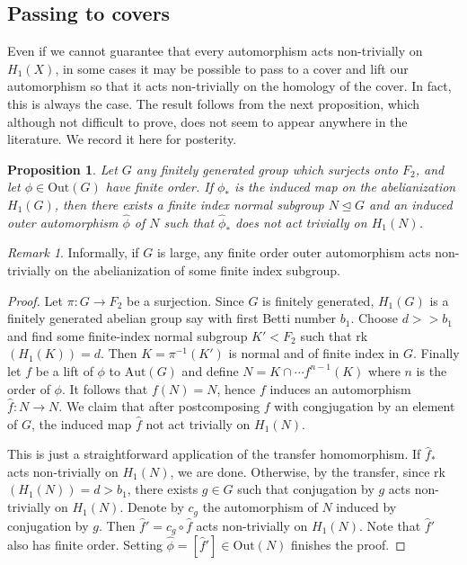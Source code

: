 \documentclass[11pt]{amsart}
\numberwithin{thm}{section}
\newtheorem{proposition}[thm]{Proposition}
\theoremstyle{remark}
\newtheorem{rmk}[thm]{Remark}
\theoremstyle{definition}
\newcommand{\Aut}{\text{Aut}}
\newcommand{\Out}{\text{Out}}
\newcommand{\what}{\widehat}
\begin{document}
\subsection{Passing to covers} Even if we cannot guarantee that every automorphism acts non-trivially on $H_1(X)$, in some cases it may be possible to pass to a cover and lift our automorphism so that it acts non-trivially on the homology of the cover. In fact, this is always the case.  The result follows from the next proposition, which although not difficult to prove, does not seem to appear anywhere in the literature.  We record it here for posterity. 

\begin{proposition} \label{LargeAut}Let $G$ any finitely generated group which surjects onto $F_2$, and let $\phi\in \Out(G)$ have finite order. If $\phi_*$ is the induced map on the abelianization $H_1(G)$, then there exists a finite index normal subgroup $N\trianglelefteq G$ and an induced outer automorphism $\what{\phi}$ of $N$ such that $\what{\phi}_*$ does not act trivially on $H_1(N)$.  
\end{proposition}
\begin{rmk} Informally, if $G$ is large, any finite order outer automorphism acts non-trivially on the abelianization of some finite index subgroup.  
\end{rmk}
\begin{proof} Let $\pi:G\rightarrow F_2$ be a surjection.  Since $G$ is finitely generated, $H_1(G)$ is a finitely generated abelian group say with first Betti number $b_1$.  Choose $d>>b_1$ and find some finite-index normal subgroup $K'<F_2$ such that rk$(H_1(K))=d$.  Then $K=\pi^{-1}(K')$ is normal and of finite index in $G$.  Finally let $f$ be a lift of $\phi$ to $\Aut(G)$ and define $N=K\cap\cdots f^{n-1}(K)$ where $n$ is the order of $\phi$.  It follows that $f(N)=N$, hence $f$ induces an automorphism $\what{f}:N\rightarrow N$. We claim that after postcomposing $f$ with congjugation by an element of $G$, the induced map $\what{f}$ not act trivially on $H_1(N)$.

This is just a straightforward application of the transfer homomorphism.  If $\what{f}_*$ acts non-trivially on $H_1(N)$, we are done.  Otherwise, by the transfer, since rk$(H_1(N))=d>b_1$, there exists $g\in G$ such that conjugation by $g$ acts non-trivially on $H_1(N)$.  Denote by $c_g$ the automorphism of $N$ induced by conjugation by $g$.  Then $\what{f}'=c_g\circ \what{f}$ acts non-trivially on $H_1(N)$.  Note that $\what{f}'$ also has finite order.  Setting $\what{\phi}=[\what{f}']\in \Out(N)$ finishes the proof.
\end{proof}
\end{document}
